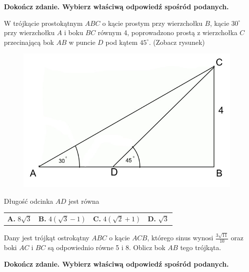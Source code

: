\documentclass[12pt,a4paper]{article}
\theoremstyle{break}
\begin{document}
	
	\begin{zad}[0-1]
		\textbf{Dokończ zdanie. Wybierz właściwą odpowiedź spośród podanych.}
	\end{zad} 
	
		W trójkącie prostokątnym $ABC$ o kącie prostym przy wierzchołku $B$, kącie $30^\circ$ przy wierzchołku $A$ i boku $BC$ równym 4, poprowadzono prostą z wierzchołka $C$ przecinającą bok $AB$ w puncie $D$ pod kątem $45^\circ$. (Zobacz rysunek)
	
	\begin{figure}[h]
		\centering
		\includegraphics[scale=0.5]{pm3.jpeg}
	\end{figure}

	Długość odcinka $AD$ jest równa
	
	\vspace{0.5cm}
	\begin{tabular}{p{3.5cm} p{3.5cm} p{3.5cm} p{3.5cm}}
		\textbf{A. }$8\sqrt{3}$&
		\textbf{B. }$4(\sqrt{3}-1)$&
		\textbf{C. }$4(\sqrt{2}+1)$&
		\textbf{D. }$\sqrt{3}$\\
	\end{tabular}

	
	\begin{zad}[0-3]
		Dany jest trójkąt ostrokątny $ABC$ o kącie $ACB$, którego sinus wynosi $\frac{3\sqrt{11}}{10}$ oraz boki $AC$ i $BC$ są odpowiednio równe 5 i 8. Oblicz bok $AB$ tego trójkąta.
	\end{zad} 
	
	\newpage
	
	\begin{zad}[0-1]
		\textbf{Dokończ zdanie. Wybierz właściwą odpowiedź spośród podanych.}
	\end{zad} 
	
\end{document}
